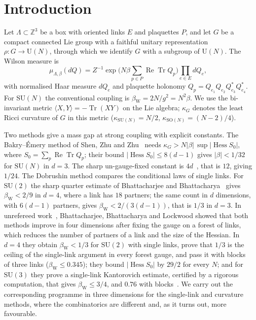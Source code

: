 \documentclass[11pt]{amsart}
\theoremstyle{definition}
\theoremstyle{remark}
\newcommand{\Tr}{\operatorname{Tr}}
\renewcommand{\Re}{\operatorname{Re}}
\newcommand{\Hess}{\operatorname{Hess}}
\newcommand{\SU}{\mathrm{SU}}
\newcommand{\SO}{\mathrm{SO}}
\newcommand{\U}{\mathrm{U}}
\newcommand{\Z}{\mathbb{Z}}
\newcommand{\ip}[2]{\langle #1,#2\rangle}
\begin{document}
\section{Introduction}

Let $\Lambda\subset\Z^3$ be a box with oriented links $E$ and plaquettes $P$, and let $G$ be a compact connected Lie
group with a faithful unitary representation $\rho:G\to\U(N)$, through which we identify $G$ with a subgroup of
$\U(N)$. The Wilson measure is
\begin{equation}\label{eq:measure}
\mu_{\Lambda,\beta}(dQ)=Z^{-1}\exp\Big(N\beta\sum_{p\in P}\Re\Tr Q_p\Big)\prod_{e\in E}dQ_e ,
\end{equation}
with normalised Haar measure $dQ_e$ and plaquette holonomy $Q_p=Q_{e_1}Q_{e_2}Q_{e_3}^*Q_{e_4}^*$. For $\SU(N)$ the
conventional coupling is $\beta_{\mathrm W}=2N/g^2=N^2\beta$. We use the bi-invariant metric
$\ip XY=-\Tr(XY)$ on the Lie algebra; $\kappa_G$ denotes the least Ricci curvature of $G$ in this metric
($\kappa_{\SU(N)}=N/2$, $\kappa_{\SO(N)}=(N-2)/4$).

Two methods give a mass gap at strong coupling with explicit constants. The Bakry--\'Emery
method of Shen, Zhu and Zhu~\cite{SZZ} needs $\kappa_G>N|\beta|\,\sup|\Hess S_0|$, where
$S_0=\sum_p\Re\Tr Q_p$; their bound $|\Hess S_0|\le8(d-1)$ gives $|\beta|<1/32$ for $\SU(N)$ in $d=3$. The sharp
un-gauge-fixed constant is $4d$~\cite{BB-zen}, that is $12$, giving $1/24$. The Dobrushin method compares the
conditional laws of single links. For $\SU(2)$ the sharp quarter estimate of Bhattacharjee and
Bhattacharya~\cite{BB-zen} gives $\beta_{\mathrm W}<2/9$ in $d=4$, where a link has $18$ partners; the same count in
$d$ dimensions, with $6(d-1)$ partners, gives $\beta_{\mathrm W}<2/(3(d-1))$, that is $1/3$ in $d=3$. In unrefereed
work~\cite{BBL}, Bhattacharjee, Bhattacharya and Lockwood showed that both methods improve in four dimensions after
fixing the gauge on a forest of links, which reduces the number of partners of a link and the size of the Hessian.
In $d=4$ they obtain $\beta_{\mathrm W}<1/3$ for $\SU(2)$ with single links, prove that $1/3$ is the ceiling of the
single-link argument in every forest gauge, and pass it with blocks of three links ($\beta_{\mathrm W}\le0.345$); they
bound $|\Hess S_0|$ by $29/2$ for every $N$; and for $\SU(3)$ they prove a single-link Kantorovich estimate, certified
by a rigorous computation, that gives $\beta_{\mathrm W}\le3/4$, and $0.76$ with blocks~\cite[Thms.~1--7]{BBL}. We carry
out the corresponding programme in three dimensions for the single-link and curvature methods, where the combinatorics
are different and, as it turns out, more favourable.
\end{document}
